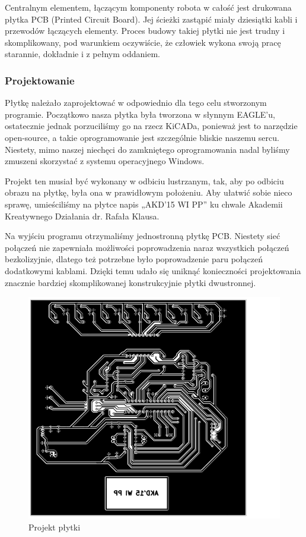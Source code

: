 Centralnym elementem, łączącym komponenty robota w całość jest drukowana płytka PCB (Printed Circuit Board). Jej ścieżki zastąpić miały dziesiątki kabli i przewodów łączących elementy. Proces budowy takiej płytki nie jest trudny i skomplikowany, pod warunkiem oczywiście, że człowiek wykona swoją pracę starannie, dokładnie i z pełnym oddaniem.

\subsubsection{Projektowanie}

Płytkę należało zaprojektować w odpowiednio dla tego celu stworzonym programie. Początkowo nasza płytka była tworzona w słynnym EAGLE'u, ostatecznie jednak porzuciliśmy go na rzecz KiCADa, ponieważ jest to narzędzie open-source, a takie oprogramowanie jest szczególnie bliskie naszemu sercu. Niestety, mimo naszej niechęci do zamkniętego oprogramowania nadal byliśmy zmuszeni skorzystać z systemu operacyjnego Windows.  

Projekt ten musiał być wykonany w odbiciu lustrzanym, tak, aby po odbiciu obrazu na płytkę, była ona w prawidłowym położeniu. Aby ułatwić sobie nieco sprawę, umieściliśmy na płytce napis „AKD’15 WI PP” ku chwale Akademii Kreatywnego Działania dr. Rafała Klausa.

Na wyjściu programu otrzymaliśmy jednostronną płytkę PCB. Niestety sieć połączeń nie zapewniała możliwości poprowadzenia naraz wszystkich połączeń bezkolizyjnie, dlatego też potrzebne było poprowadzenie paru połączeń dodatkowymi kablami. Dzięki temu udało się uniknąć konieczności projektowania znacznie bardziej skomplikowanej konstrukcyjnie płytki dwustronnej. 

\begin{figure}
\centering
\includegraphics[scale=0.75]{board.png}
\caption{Projekt płytki}
\end{figure}
